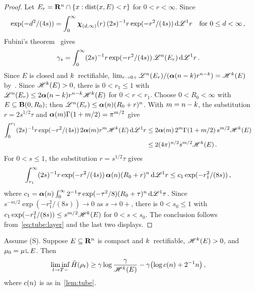 \documentclass[a4paper,twoside,leqno]{article}
\begin{document}
\begin{proof}
    Let $E_r = \mathbf{R}^{n} \cap \{ x : \operatorname{dist}(x,E) < r \}$ for $0 < r < \infty$. Since
    \begin{displaymath}
        \exp(-d^2 / (4s)) = \int_0^\infty \boldsymbol{\chi}_{(d,\infty)}(r) \, (2s)^{-1} r \exp(-r^2/(4s)) \,\mathrm{d}
        \mathscr{L}^1 r \quad \text{for $0 \le d < \infty$} \,,
    \end{displaymath}
    Fubini's theorem~\cite[2.6.2]{Federer1969} gives
    \begin{equation}
        \label{eq:tube:layer}
        \gamma_s = \int_0^\infty (2s)^{-1} r \exp(-r^2/(4s)) \, \mathscr{L}^{n}(E_r) \,\mathrm{d} \mathscr{L}^1 r \,.
    \end{equation}
    Since $E$ is closed and $k$~rectifiable, $\lim_{r \to 0+} \mathscr{L}^{n}(E_r) /
    (\boldsymbol{\alpha}(n - k) r^{n - k}) = \mathscr{H}^{k}(E)$ by~\cite[3.2.37,
    3.2.39]{Federer1969}. Since $\mathscr{H}^{k}(E) > 0$, there is $0 < r_1 \le 1$ with
    $\mathscr{L}^{n}(E_r) \le 2 \boldsymbol{\alpha}(n - k) r^{n - k} \mathscr{H}^{k}(E)$ for $0
    < r < r_1$. Choose $0 < R_0 < \infty$ with $E \subseteq \mathbf{B}(0,R_0)$; then
    $\mathscr{L}^{n}(E_r) \le \boldsymbol{\alpha}(n) (R_0 + r)^{n}$. With $m = n - k$, the
    substitution $r = 2 s^{1/2} \tau$ and $\boldsymbol{\alpha}(m) \Gamma(1 + m/2) = \pi^{m/2}$ give
    \begin{align*}
        \int_0^{r_1} (2s)^{-1} r \exp(-r^2/(4s)) \, 2 \boldsymbol{\alpha}(m) r^m \mathscr{H}^{k}(E) \,\mathrm{d} \mathscr{L}^1
        r & \le 2 \boldsymbol{\alpha}(m) \, 2^m \Gamma(1 + m/2) \, s^{m/2} \mathscr{H}^{k}(E) \\
        & \le 2 (4 \pi)^{n/2} s^{m/2} \mathscr{H}^{k}(E) \,.
    \end{align*}
    For $0 < s \le 1$, the substitution $r = s^{1/2} \tau$ gives
    \begin{displaymath}
        \int_{r_1}^\infty (2s)^{-1} r \exp(-r^2/(4s)) \, \boldsymbol{\alpha}(n) (R_0 + r)^{n} \,\mathrm{d}
        \mathscr{L}^1 r \le c_1 \exp(-r_1^2/(8s)) \,,
    \end{displaymath}
    where $c_1 = \boldsymbol{\alpha}(n) \int_0^\infty 2^{-1} \tau \exp(-\tau^2/8) (R_0 +
    \tau)^{n} \,\mathrm{d} \mathscr{L}^1 \tau$.
    Since $s^{-m/2} \exp(-r_1^2/(8s)) \to 0$ as $s \to 0+$, there is $0 < s_0 \le 1$ with $c_1
    \exp(-r_1^2/(8s)) \le s^{m/2} \mathscr{H}^{k}(E)$ for $0 < s < s_0$. The conclusion follows
    from~\eqref{eq:tube:layer} and the last two displays.
\end{proof}

\begin{lemma}
    \label{lem:lower_entropy}
    Assume (S). Suppose $E \subseteq \mathbf{R}^{n}$ is compact and $k$~rectifiable,
    $\mathscr{H}^{k}(E) > 0$, and $\mu_0 = \mu \restrict E$. Then
    \begin{displaymath}
        \liminf_{t \to T-} \tilde H(\rho_t) \ge \gamma \log \frac{\gamma}{\mathscr{H}^{k}(E)} - \gamma
        \bigl( \log c(n) + 2^{-1} n \bigr) \,,
    \end{displaymath}
    where $c(n)$ is as in~\ref{lem:tube}.
\end{lemma}
\end{document}
